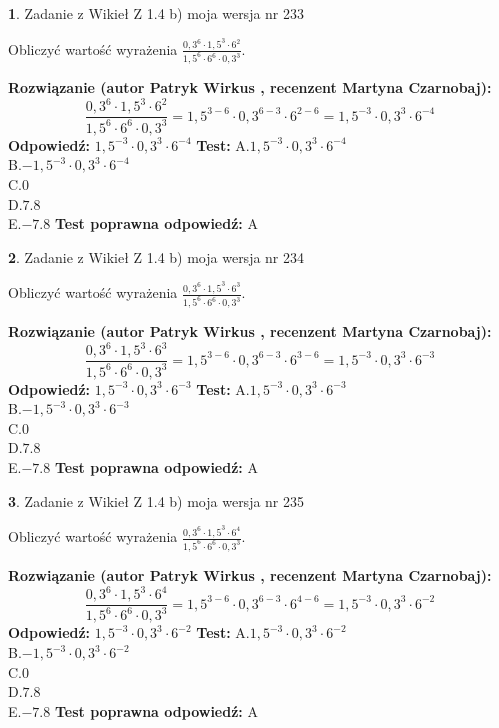 \documentclass[12pt, a4paper]{article}
\theoremstyle{definition} %
\newtheorem{zad}{}
\newcommand{\zadStart}[1]{\begin{zad}#1\newline}
\newcommand{\zadStop}{\end{zad}}
\newcommand{\rozwStart}[2]{\noindent \textbf{Rozwiązanie (autor #1 , recenzent #2): }\newline}
\newcommand{\rozwStop}{\newline}
\newcommand{\odpStart}{\noindent \textbf{Odpowiedź:}\newline}
\newcommand{\odpStop}{\newline}
\newcommand{\testStart}{\noindent \textbf{Test:}\newline}
\newcommand{\testStop}{\newline}
\newcommand{\kluczStart}{\noindent \textbf{Test poprawna odpowiedź:}\newline}
\newcommand{\kluczStop}{\newline}
\begin{document}
\zadStart{Zadanie z Wikieł Z 1.4 b) moja wersja nr 233}

Obliczyć wartość wyrażenia $\frac{0,3^{6}\cdot1,5^{3}\cdot6^{2}}{1,5^{6}\cdot6^{6}\cdot0,3^{3}}$.
\zadStop
\rozwStart{Patryk Wirkus}{Martyna Czarnobaj}
$$\frac{0,3^{6}\cdot1,5^{3}\cdot6^{2}}{1,5^{6}\cdot6^{6}\cdot0,3^{3}} = 1,5^{3-6} \cdot 0,3^{6-3} \cdot 6^{2-6} = 1,5^{-3} \cdot 0,3^{3} \cdot 6^{-4}$$
\rozwStop
\odpStart
$1,5^{-3} \cdot 0,3^{3} \cdot 6^{-4}$
\odpStop
\testStart
A.$1,5^{-3} \cdot 0,3^{3} \cdot 6^{-4}$\\ B.$-1,5^{-3} \cdot 0,3^{3} \cdot 6^{-4}$\\ C.$0$\\ D.$7.8$\\ E.$-7.8$
\testStop
\kluczStart
A
\kluczStop



\zadStart{Zadanie z Wikieł Z 1.4 b) moja wersja nr 234}

Obliczyć wartość wyrażenia $\frac{0,3^{6}\cdot1,5^{3}\cdot6^{3}}{1,5^{6}\cdot6^{6}\cdot0,3^{3}}$.
\zadStop
\rozwStart{Patryk Wirkus}{Martyna Czarnobaj}
$$\frac{0,3^{6}\cdot1,5^{3}\cdot6^{3}}{1,5^{6}\cdot6^{6}\cdot0,3^{3}} = 1,5^{3-6} \cdot 0,3^{6-3} \cdot 6^{3-6} = 1,5^{-3} \cdot 0,3^{3} \cdot 6^{-3}$$
\rozwStop
\odpStart
$1,5^{-3} \cdot 0,3^{3} \cdot 6^{-3}$
\odpStop
\testStart
A.$1,5^{-3} \cdot 0,3^{3} \cdot 6^{-3}$\\ B.$-1,5^{-3} \cdot 0,3^{3} \cdot 6^{-3}$\\ C.$0$\\ D.$7.8$\\ E.$-7.8$
\testStop
\kluczStart
A
\kluczStop



\zadStart{Zadanie z Wikieł Z 1.4 b) moja wersja nr 235}

Obliczyć wartość wyrażenia $\frac{0,3^{6}\cdot1,5^{3}\cdot6^{4}}{1,5^{6}\cdot6^{6}\cdot0,3^{3}}$.
\zadStop
\rozwStart{Patryk Wirkus}{Martyna Czarnobaj}
$$\frac{0,3^{6}\cdot1,5^{3}\cdot6^{4}}{1,5^{6}\cdot6^{6}\cdot0,3^{3}} = 1,5^{3-6} \cdot 0,3^{6-3} \cdot 6^{4-6} = 1,5^{-3} \cdot 0,3^{3} \cdot 6^{-2}$$
\rozwStop
\odpStart
$1,5^{-3} \cdot 0,3^{3} \cdot 6^{-2}$
\odpStop
\testStart
A.$1,5^{-3} \cdot 0,3^{3} \cdot 6^{-2}$\\ B.$-1,5^{-3} \cdot 0,3^{3} \cdot 6^{-2}$\\ C.$0$\\ D.$7.8$\\ E.$-7.8$
\testStop
\kluczStart
A
\kluczStop
\end{document}

